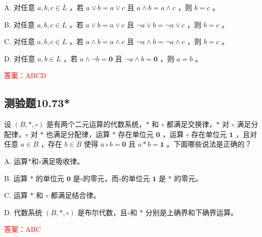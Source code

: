 \documentclass[UTF8, heading=true]{ctexart}
\begin{document}
A. 对任意 $a, b, c \in L$ ，若 $a \vee b=a \vee c$ 且 $a \wedge b=a \wedge c$ ，则 $b=c$ 。

B. 对任意 $a, b, c \in L$ ，若 $a \vee b=a \vee c$ 且 $\neg a \vee b=\neg a \vee c$ ，则 $b=c$ 。

C. 对任意 $a, b, c \in L$ ，若 $a \wedge b=a \wedge c$ 且 $\neg a \wedge b=\neg a \wedge c$ ，则 $b=c$ 。

D. 对任意 $a, b \in L$ ，若 $a \wedge \neg b=\mathbf{0}$ 且 $\neg a \wedge b=\mathbf{0}$ ，则 $a=b$ 。


\textcolor{red}{答案：ABCD}



\subsection{测验题10.73*}

设 $(B, *, \circ)$ 是有两个二元运算的代数系统，$*$ 和 $\circ$ 都满足交换律，$*$ 对 $\circ$ 满足分配律，$\circ$ 对 $*$ 也满足分配律，运算 $*$ 存在单位元 $\mathbf{0}$ ，运算 $\circ$ 存在单位元 $\mathbf{1}$ ，且对任意 $a \in B$ ，存在 $b \in B$ 使得 $a \circ b=\mathbf{0}$ 且 $a * b=\mathbf{1}$ 。下面哪些说法是正确的？

A. 运算$*$和$\circ$满足吸收律。

B. 运算 $*$ 的单位元 $\mathbf{0}$ 是$\circ$的零元，而$\circ$的单位元 $\mathbf{1}$ 是 $*$ 的零元。

C. 运算 $*$ 和 $\circ$ 都满足结合律。

D. 代数系统 $(B, *, \circ)$ 是布尔代数，且$\circ$和 $*$ 分别是上确界和下确界运算。

\textcolor{red}{答案：ABC}
\end{document}
